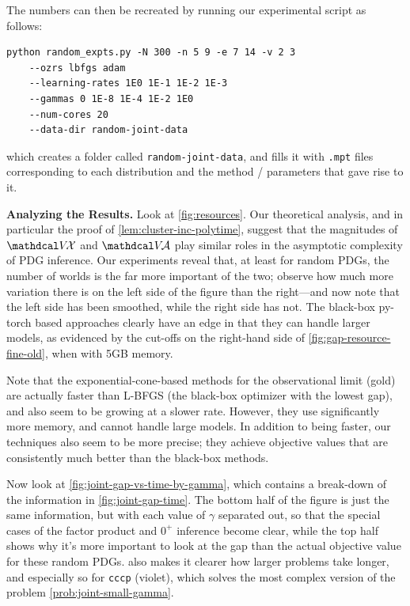 \begin{subappendices}
The numbers can then be recreated by running our experimental script as follows:
\begin{verbatim}
python random_expts.py -N 300 -n 5 9 -e 7 14 -v 2 3
    --ozrs lbfgs adam
    --learning-rates 1E0 1E-1 1E-2 1E-3
    --gammas 0 1E-8 1E-4 1E-2 1E0
    --num-cores 20
    --data-dir random-joint-data
\end{verbatim}
which creates a folder called \verb|random-joint-data|,
and fills it with \verb|.mpt| files corresponding to each distribution
and the method / parameters that gave rise to it.

\textbf{Analyzing the Results.}
Look at  \cref{fig:resources}.  Our theoretical analysis, and in particular the proof of \cref{lem:cluster-inc-polytime}, suggest that the magnitudes of $\V\!\X$ and $\V\!\Ar$ play similar roles in the asymptotic complexity of PDG inference.
Our experiments reveal that, at least for random PDGs, the number of worlds is the far more important of the two; observe how much more variation there is on the left side of the figure than the right---and now note that the left side has been smoothed, while the right side has not.
The black-box py-torch based approaches clearly have an edge in that they can handle larger models, as evidenced by the cut-offs on the right-hand side of \cref{fig:gap-resource-fine-old}, when with 5GB memory.

Note that the exponential-cone-based methods for the observational limit (gold) are actually faster than L-BFGS (the black-box optimizer with the lowest gap), and also seem to be growing at a slower rate.
However, they use significantly more memory, and cannot handle large models.
In addition to being faster, our techniques also seem to be more precise; they achieve objective values that are consistently much better than the black-box methods.


Now look at \cref{fig:joint-gap-vs-time-by-gamma},
which contains a break-down of the information in \cref{fig:joint-gap-time}. The bottom half of the figure is just the same information, but with each value of $\gamma$ separated out, so that the special cases of the factor product and $0^+$ inference become clear, while the top half shows why it's more important to look at the gap than the actual objective value for these random PDGs.
 also makes it clearer how larger problems take longer, and especially so for \texttt{cccp} (violet), which solves the most complex version of the problem \eqref{prob:joint-small-gamma}.


\end{subappendices}
